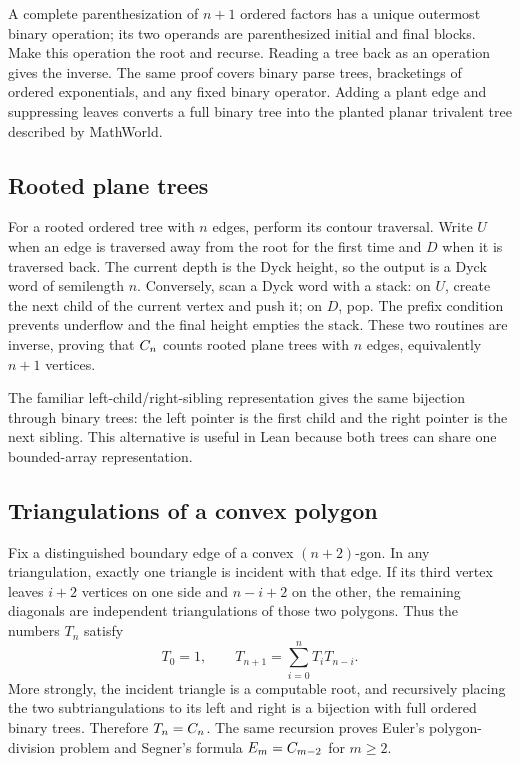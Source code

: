 A complete parenthesization of $n+1$ ordered factors has a unique outermost
binary operation; its two operands are parenthesized initial and final blocks.
Make this operation the root and recurse.  Reading a tree back as an operation
gives the inverse.  The same proof covers binary parse trees, bracketings of
ordered exponentials, and any fixed binary operator.  Adding a plant edge and
suppressing leaves converts a full binary tree into the planted planar
trivalent tree described by MathWorld.

\subsection{Rooted plane trees}

For a rooted ordered tree with $n$ edges, perform its contour traversal.  Write
$U$ when an edge is traversed away from the root for the first time and $D$
when it is traversed back.  The current depth is the Dyck height, so the output
is a Dyck word of semilength $n$.  Conversely, scan a Dyck word with a stack:
on $U$, create the next child of the current vertex and push it; on $D$, pop.
The prefix condition prevents underflow and the final height empties the
stack.  These two routines are inverse, proving that $C_n$ counts rooted
plane trees with $n$ edges, equivalently $n+1$ vertices.

The familiar left-child/right-sibling representation gives the same
bijection through binary trees: the left pointer is the first child and the
right pointer is the next sibling.  This alternative is useful in Lean because
both trees can share one bounded-array representation.

\subsection{Triangulations of a convex polygon}

Fix a distinguished boundary edge of a convex $(n+2)$-gon.  In any
triangulation, exactly one triangle is incident with that edge.  If its third
vertex leaves $i+2$ vertices on one side and $n-i+2$ on the other, the remaining
diagonals are independent triangulations of those two polygons.  Thus the
numbers $T_n$ satisfy
\[
 T_0=1,\qquad T_{n+1}=\sum_{i=0}^{n}T_iT_{n-i}.                  \tag{3.3}
\]
More strongly, the incident triangle is a computable root, and recursively
placing the two subtriangulations to its left and right is a bijection with
full ordered binary trees.  Therefore $T_n=C_n$.  The same recursion proves
Euler's polygon-division problem and Segner's formula
$E_m=C_{m-2}$ for $m\ge2$.


